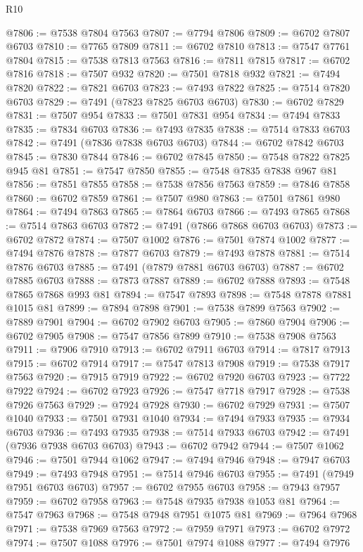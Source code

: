 \begin{lexlean}{R10}
\begin{coremodule}
{{{{{{{{{{{{{{{{{{{{{{{{{{{{{{{{{{{{{{{{{{{{{{{{{{{{{{{{{{{{{{{{{{{{{{{{{{{{{{{{{{{{@7806 := @7538 @7804 @7563
@7807 := @7794 @7806
@7809 := @6702 @7807 @6703
@7810 := @7765 @7809
@7811 := @6702 @7810
@7813 := @7547 @7761 @7804
@7815 := @7538 @7813 @7563
@7816 := @7811 @7815
@7817 := @6702 @7816
@7818 := @7507 @932
@7820 := @7501 @7818 @932
@7821 := @7494 @7820
@7822 := @7821 @6703
@7823 := @7493 @7822
@7825 := @7514 @7820 @6703
@7829 := @7491 (@7823 @7825 @6703 @6703)
@7830 := @6702 @7829
@7831 := @7507 @954
@7833 := @7501 @7831 @954
@7834 := @7494 @7833
@7835 := @7834 @6703
@7836 := @7493 @7835
@7838 := @7514 @7833 @6703
@7842 := @7491 (@7836 @7838 @6703 @6703)
@7844 := @6702 @7842 @6703
@7845 := @7830 @7844
@7846 := @6702 @7845
@7850 := @7548 @7822 @7825 @945 @81
@7851 := @7547 @7850
@7855 := @7548 @7835 @7838 @967 @81
@7856 := @7851 @7855
@7858 := @7538 @7856 @7563
@7859 := @7846 @7858
@7860 := @6702 @7859
@7861 := @7507 @980
@7863 := @7501 @7861 @980
@7864 := @7494 @7863
@7865 := @7864 @6703
@7866 := @7493 @7865
@7868 := @7514 @7863 @6703
@7872 := @7491 (@7866 @7868 @6703 @6703)
@7873 := @6702 @7872
@7874 := @7507 @1002
@7876 := @7501 @7874 @1002
@7877 := @7494 @7876
@7878 := @7877 @6703
@7879 := @7493 @7878
@7881 := @7514 @7876 @6703
@7885 := @7491 (@7879 @7881 @6703 @6703)
@7887 := @6702 @7885 @6703
@7888 := @7873 @7887
@7889 := @6702 @7888
@7893 := @7548 @7865 @7868 @993 @81
@7894 := @7547 @7893
@7898 := @7548 @7878 @7881 @1015 @81
@7899 := @7894 @7898
@7901 := @7538 @7899 @7563
@7902 := @7889 @7901
@7904 := @6702 @7902 @6703
@7905 := @7860 @7904
@7906 := @6702 @7905
@7908 := @7547 @7856 @7899
@7910 := @7538 @7908 @7563
@7911 := @7906 @7910
@7913 := @6702 @7911 @6703
@7914 := @7817 @7913
@7915 := @6702 @7914
@7917 := @7547 @7813 @7908
@7919 := @7538 @7917 @7563
@7920 := @7915 @7919
@7922 := @6702 @7920 @6703
@7923 := @7722 @7922
@7924 := @6702 @7923
@7926 := @7547 @7718 @7917
@7928 := @7538 @7926 @7563
@7929 := @7924 @7928
@7930 := @6702 @7929
@7931 := @7507 @1040
@7933 := @7501 @7931 @1040
@7934 := @7494 @7933
@7935 := @7934 @6703
@7936 := @7493 @7935
@7938 := @7514 @7933 @6703
@7942 := @7491 (@7936 @7938 @6703 @6703)
@7943 := @6702 @7942
@7944 := @7507 @1062
@7946 := @7501 @7944 @1062
@7947 := @7494 @7946
@7948 := @7947 @6703
@7949 := @7493 @7948
@7951 := @7514 @7946 @6703
@7955 := @7491 (@7949 @7951 @6703 @6703)
@7957 := @6702 @7955 @6703
@7958 := @7943 @7957
@7959 := @6702 @7958
@7963 := @7548 @7935 @7938 @1053 @81
@7964 := @7547 @7963
@7968 := @7548 @7948 @7951 @1075 @81
@7969 := @7964 @7968
@7971 := @7538 @7969 @7563
@7972 := @7959 @7971
@7973 := @6702 @7972
@7974 := @7507 @1088
@7976 := @7501 @7974 @1088
@7977 := @7494 @7976
}}}}}}}}}}}}}}}}}}}}}}}}}}}}}}}}}}}}}}}}}}}}}}}}}}}}}}}}}}}}}}}}}}}}}}}}}}}}}}}}}}}}
\end{coremodule}
\end{lexlean}
